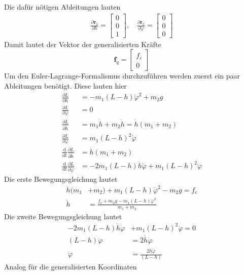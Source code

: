 Die dafür nötigen Ableitungen lauten
\begin{align*}
	\frac{\partial \textbf{r}_2}{\partial h} = \begin{bmatrix}
		0 \\
		0 \\
		1
	\end{bmatrix}
	, \quad
	\frac{\partial \textbf{r}_2}{\partial \varphi} = \begin{bmatrix}
	0 \\
	0 \\
	0
	\end{bmatrix}
\end{align*}
Damit lautet der Vektor der generalisierten Kräfte
\[
	\textbf{f}_q = \begin{bmatrix}
		f_e \\
		0
	\end{bmatrix}
\]
\newpage
\noindent
Um den Euler-Lagrange-Formalismus durchzuführen werden zuerst ein paar Ableitungen benötigt. Diese lauten hier
\begin{align*}
	\frac{\partial L}{\partial h} &= -m_1(L - h)\dot{\varphi}^2 + m_2g \\
	\frac{\partial L}{\partial \varphi} &= 0 \\
	\frac{\partial L}{\partial \dot{h}} &= m_1\dot{h} + m_2\dot{h} = \dot{h}(m_1 + m_2) \\
	\frac{\partial L}{\partial \dot{\varphi}} &= m_1(L - h)^2\dot{\varphi} \\
	\frac{\text{d}}{\text{d}t}\frac{\partial L}{\partial \dot{h}} &= \ddot{h}(m_1 + m_2) \\
	\frac{\text{d}}{\text{d}t}\frac{\partial L}{\partial \dot{\varphi}} &= -2m_1(L - h)\dot{h}\dot{\varphi} + m_1(L - h)^2\ddot{\varphi}
\end{align*}
Die erste Bewegungsgleichung lautet
\begin{align*}
	\ddot{h}(m_1 &+ m_2) + m_1(L - h)\dot{\varphi}^2 - m_2g = f_e \\
	\ddot{h} &= \frac{f_e + m_2g - m_1(L - h)\dot{\varphi}^2}{m_1 + m_2}
\end{align*}
Die zweite Bewegungsgleichung lautet
\begin{align*}
	-2m_1(L - h)\dot{h}\dot{\varphi} &+ m_1(L - h)^2\ddot{\varphi} = 0 \\
	(L - h)\ddot{\varphi} &= 2\dot{h}\dot{\varphi} \\
	\ddot{\varphi} &= \frac{2\dot{h}\dot{\varphi}}{(L - h)}
\end{align*}
\newpage
\noindent
Analog für die generalisierten Koordinaten 
